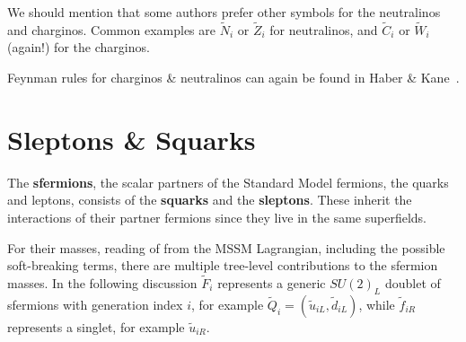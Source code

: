 \documentclass[notes.tex]{subfiles}
\begin{document}
We should mention that some authors prefer other symbols for the neutralinos and charginos. Common examples are $\tilde N_i$ or $\tilde Z_i$ for neutralinos, and $\tilde C_i$ or $\tilde W_i$ (again!) for the charginos. 

Feynman rules for charginos \& neutralinos can again be found in Haber \& Kane~\cite{Haber:1984rc}.




\section{Sleptons \& Squarks}
The {\bf sfermions}, the scalar partners of the Standard Model fermions, the quarks and leptons, consists of the {\bf squarks} and the {\bf sleptons}. These inherit the interactions of their partner fermions since they live in the same superfields.

For their masses, reading of from the MSSM Lagrangian, including the possible soft-breaking terms,  there are multiple tree-level contributions to the sfermion masses. In the following discussion  $\tilde{F}_i$ represents a generic $SU(2)_L$ doublet of sfermions with generation index $i$, for example $\tilde Q_i=(\tilde u_{iL},\tilde d_{iL})$, while $\tilde{f}_{iR}$ represents a singlet, for example $\tilde u_{iR}$.
\end{document}
